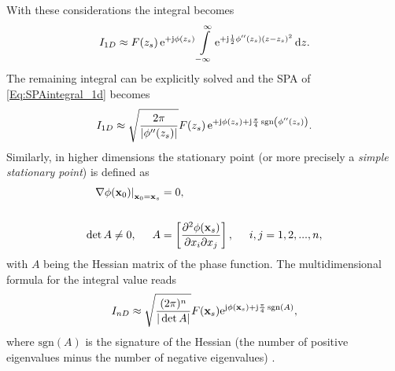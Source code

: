 With these considerations the integral becomes
\begin{align}
I_{1D} \approx F(z_s)\,\mathrm{e}^{+\mathrm{j}\phi(z_s)} 
\int\limits_{-\infty}^{\infty} \mathrm{e}^{+\mathrm{j} \frac{1}{2}\phi''(z_s)(z-z_s)^2} \, \mathrm{d} z.
\end{align}
The remaining integral can be explicitly solved and the SPA of \eqref{Eq:SPAintegral_1d} becomes \cite[Ch. 2.8]{Blenstein1975}
\begin{equation}
\label{Eq:SPAResult}
I_{1D} \approx \sqrt{\frac{2\pi}{| \phi''(z_s) |}} F(z_s) \, \mathrm{e}^{+\mathrm{j} \phi(z_s) + \mathrm{j} \frac{\pi}{4}\,\mathrm{sgn}\left(  \phi''(z_s) \right)}. 
\end{equation}
\vspace{3mm}
Similarly, in higher dimensions the stationary point (or more precisely a \emph{simple stationary point}) is defined as
\begin{align}
\label{Eq:ndim_stat_point}
\begin{split}
\left. \nabla \phi(\vxo)\right|_{\vxo = \vx_s} &= 0,
\\ \vspace{3mm} \\
\det A \neq 0,
\hspace{5mm} 
A &= \left[
\frac{\partial^2 \phi(\vx_s)}{\partial x_i \partial x_j} 
\right],
\hspace{5mm}
i,j = 1,2,...,n,
\end{split}
\end{align}
with $A$ being the Hessian matrix of the phase function. The multidimensional formula for the integral value reads
\begin{equation}
\label{Eq:SPAResult_nd}
I_{nD} \approx \sqrt{\frac{(2\pi)^n}{|\det A|}} F(\mathbf{x}_s) \mathrm{e}^{\mathrm{j} \phi(\mathbf{x}_s) + \mathrm{j} \frac{\pi}{4}\,\mathrm{sgn}\left( A \right)},
\end{equation}
where $\mathrm{sgn}\left( A \right)$ is the signature of the Hessian (the number of positive eigenvalues minus the number of negative eigenvalues) \cite{Bleistein2000}.

